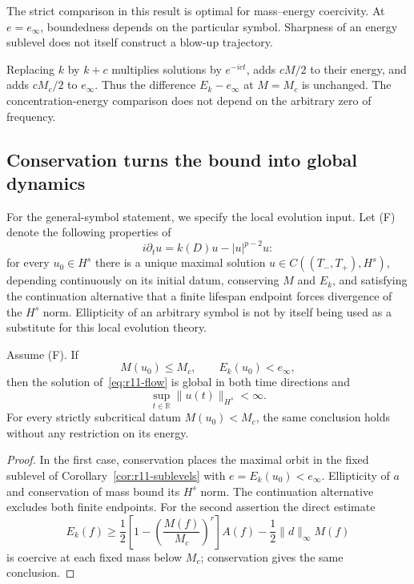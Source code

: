 The strict comparison in this result is optimal for mass--energy
coercivity.  At $e=e_\infty$, boundedness depends on the particular
symbol.  Sharpness of an energy sublevel does not itself construct a
blow-up trajectory.

\begin{remark}
Replacing $k$ by $k+c$ multiplies solutions by $e^{-ict}$, adds $cM/2$
to their energy, and adds $cM_c/2$ to $e_\infty$.  Thus the difference
$E_k-e_\infty$ at $M=M_c$ is unchanged.  The concentration-energy
comparison does not depend on the arbitrary zero of frequency.
\end{remark}

\subsection{Conservation turns the bound into global dynamics}

For the general-symbol statement, we specify the local evolution input.
Let \textup{(F)} denote the following properties of
\begin{equation}\label{eq:r11-flow}
 i\partial_tu=k(D)u-|u|^{p-2}u:
\end{equation}
for every $u_0\in H^s$ there is a unique maximal solution
$u\in C((T_-,T_+),H^s)$, depending continuously on its initial datum,
conserving $M$ and $E_k$, and satisfying the continuation alternative
that a finite lifespan endpoint forces divergence of the $H^s$ norm.
Ellipticity of an arbitrary symbol is not by itself being used as a
substitute for this local evolution theory.

\begin{theorem}
\label{thm:r11-global-endpoint}
Assume \textup{(F)}.  If
\[
 M(u_0)\le M_c,\qquad E_k(u_0)<e_\infty,
\]
then the solution of~\eqref{eq:r11-flow} is global in both time
directions and
\[
 \sup_{t\in\mathbb R}\|u(t)\|_{H^s}<\infty.
\]
For every strictly subcritical datum $M(u_0)<M_c$, the same conclusion
holds without any restriction on its energy.
\end{theorem}

\begin{proof}
In the first case, conservation places the maximal orbit in the fixed
sublevel of Corollary~\ref{cor:r11-sublevels} with
$e=E_k(u_0)<e_\infty$.  Ellipticity of $a$ and conservation of mass
bound its $H^s$ norm.  The continuation alternative excludes both
finite endpoints.  For the second assertion the direct estimate
\begin{equation}\label{eq:r11-subcritical-coercivity}
 E_k(f)\ge\frac12\left[1-\left(\frac{M(f)}{M_c}\right)^r\right]A(f)
             -\frac12\|d\|_\infty M(f)
\end{equation}
is coercive at each fixed mass below $M_c$; conservation gives the
same conclusion.
\end{proof}

